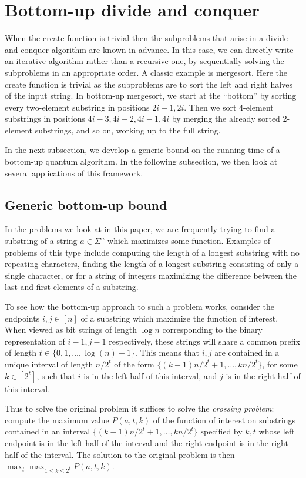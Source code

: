 \documentclass[12pt]{article}
\theoremstyle{definition}
\begin{document}
\section{Bottom-up divide and conquer}
\label{sec:bottomup}
When the create function is trivial then the subproblems that arise in a divide and conquer algorithm are known in advance.  In this case, we can directly write an iterative algorithm rather than a recursive one, by sequentially solving the subproblems in an appropriate order.  A classic example is mergesort.
Here the create function is trivial as the subproblems are to sort the left and right halves of the input string.  In bottom-up mergesort, we start at the ``bottom'' by sorting every two-element substring in positions $2i-1, 2i$.
Then we sort 4-element substrings in positions $4i-3, 4i-2,4i-1,4i$ by merging the already sorted 2-element substrings, and so on, working up to the full string.  

In the next subsection, we develop a generic bound on the running time of a bottom-up quantum algorithm.  In the following subsection, we then look at several applications of this framework.

\subsection{Generic bottom-up bound}
In the problems we look at in this paper, we are frequently trying to find a substring of a string $a \in \Sigma^n$ which maximizes some function. 
Examples of problems of this type include computing the length of a longest substring with no repeating characters, finding the length of a longest substring consisting 
of only a single character, or for a string of integers maximizing the difference between the last and first elements of a substring.

To see how the bottom-up approach to such a problem works, consider the endpoints $i,j \in [n]$ of a substring which maximize the function of interest.  When viewed as bit strings of length $\log n$ corresponding to the binary representation of $i-1, j-1$ respectively, these strings will share a common prefix of length $t \in \{0, 1, \ldots, \log(n) -1\}$.
This means that $i,j$ are contained in a unique interval of length $n/2^t$ of the form $\{(k-1)n/2^t+1, \ldots, kn/2^t\}$, for some $k \in [2^t]$, such that $i$ is in the left half of this interval, and $j$ is in the right half of this interval.  

Thus to solve the original problem it suffices to solve the \emph{crossing problem}: compute the maximum value $P(a, t, k)$ of the function of interest on substrings contained in an interval $\{(k-1)n/2^t+1, \ldots, kn/2^t\}$ specified by $k,t$ whose left endpoint is in the left half of the interval and the right endpoint is in the right half of the interval. 
The solution to the original problem is then $\max_t \max_{1 \le k \le 2^t} P(a, t, k)$.
\end{document}

